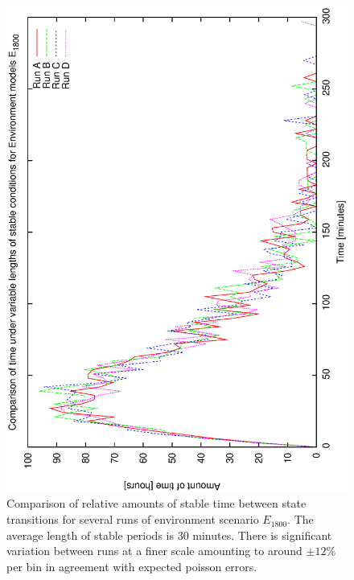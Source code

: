 \begin{figure}[h]
\begin{center}
 \includegraphics[scale=0.5, angle=-90]{figures/e_18_comp.eps}
 \caption[Comparison of relative amounts of stable time for environment scenario $E_{1800}$.] 
   {Comparison of relative amounts of stable time between state transitions for several runs of environment scenario $E_{1800}$. The average length of stable periods is 30 minutes. There is significant variation between runs at a finer scale amounting to around $\pm 12$\% per bin in agreement with expected poisson errors.}
\label{fig:env_comp_18}
\end{center} 
\end{figure}

